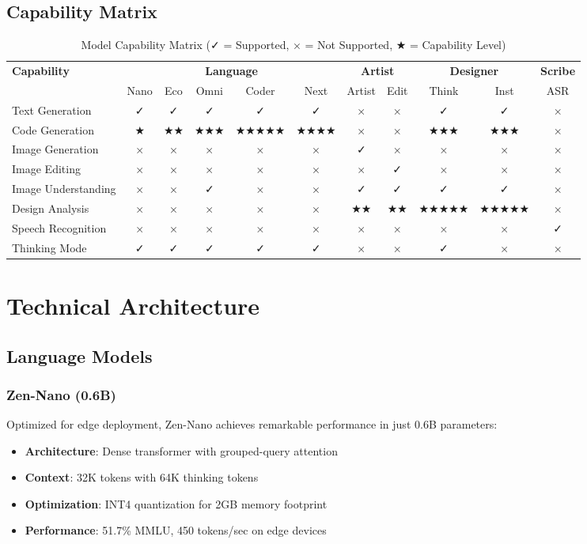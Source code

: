 \documentclass[11pt,a4paper]{article}
\begin{document}
\subsection{Capability Matrix}

\begin{table}[H]
\centering
\footnotesize
\begin{tabular}{l|ccccc|cc|cc|c}
\toprule
\textbf{Capability} & \multicolumn{5}{c|}{\textbf{Language}} & \multicolumn{2}{c|}{\textbf{Artist}} & \multicolumn{2}{c|}{\textbf{Designer}} & \textbf{Scribe} \\
& Nano & Eco & Omni & Coder & Next & Artist & Edit & Think & Inst & ASR \\
\midrule
Text Generation & ✓ & ✓ & ✓ & ✓ & ✓ & × & × & ✓ & ✓ & × \\
Code Generation & ★ & ★★ & ★★★ & ★★★★★ & ★★★★ & × & × & ★★★ & ★★★ & × \\
Image Generation & × & × & × & × & × & ✓ & × & × & × & × \\
Image Editing & × & × & × & × & × & × & ✓ & × & × & × \\
Image Understanding & × & × & ✓ & × & × & ✓ & ✓ & ✓ & ✓ & × \\
Design Analysis & × & × & × & × & × & ★★ & ★★ & ★★★★★ & ★★★★★ & × \\
Speech Recognition & × & × & × & × & × & × & × & × & × & ✓ \\
Thinking Mode & ✓ & ✓ & ✓ & ✓ & ✓ & × & × & ✓ & × & × \\
\bottomrule
\end{tabular}
\caption{Model Capability Matrix (✓ = Supported, × = Not Supported, ★ = Capability Level)}
\end{table}

\section{Technical Architecture}

\subsection{Language Models}

\subsubsection{Zen-Nano (0.6B)}
Optimized for edge deployment, Zen-Nano achieves remarkable performance in just 0.6B parameters:
\begin{itemize}
    \item \textbf{Architecture}: Dense transformer with grouped-query attention
    \item \textbf{Context}: 32K tokens with 64K thinking tokens
    \item \textbf{Optimization}: INT4 quantization for 2GB memory footprint
    \item \textbf{Performance}: 51.7\% MMLU, 450 tokens/sec on edge devices
\end{itemize}
\end{document}
